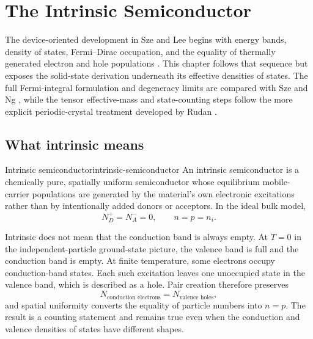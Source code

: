 \chapter{The Intrinsic Semiconductor}
\label{ch:intrinsic-semiconductor}

The device-oriented development in Sze and Lee begins with energy bands,
density of states, Fermi--Dirac occupation, and the equality of thermally
generated electron and hole populations \cite[Sec.~1.5]{szeLee2012}.  This
chapter follows that sequence but exposes the solid-state derivation underneath
its effective densities of states.  The full Fermi-integral formulation and
degeneracy limits are compared with Sze and Ng \cite[Sec.~1.4]{szeNg2007},
while the tensor effective-mass and state-counting steps follow the more
explicit periodic-crystal treatment developed by Rudan
\cite[Secs.~17.6.3 and 18.2--18.3]{rudan2015}.

\section{What intrinsic means}

\begin{definition}{Intrinsic semiconductor}{intrinsic-semiconductor}
An intrinsic semiconductor is a chemically pure, spatially uniform
semiconductor whose equilibrium mobile-carrier populations are generated by
the material's own electronic excitations rather than by intentionally added
donors or acceptors.  In the ideal bulk model,
\begin{equation}
  N_D^+=N_A^-=0,
  \qquad
  n=p=n_i.
  \label{eq:intrinsic-definition}
\end{equation}
\end{definition}

Intrinsic does not mean that the conduction band is always empty.  At
$T=0$ in the independent-particle ground-state picture, the valence band is
full and the conduction band is empty.  At finite temperature, some electrons
occupy conduction-band states.  Each such excitation leaves one unoccupied
state in the valence band, which is described as a hole.  Pair creation
therefore preserves
\begin{equation}
  N_{\text{conduction electrons}}
  =N_{\text{valence holes}},
  \label{eq:intrinsic-pair-counting}
\end{equation}
and spatial uniformity converts the equality of particle numbers into $n=p$.
The result is a counting statement and remains true even when the conduction
and valence densities of states have different shapes.

